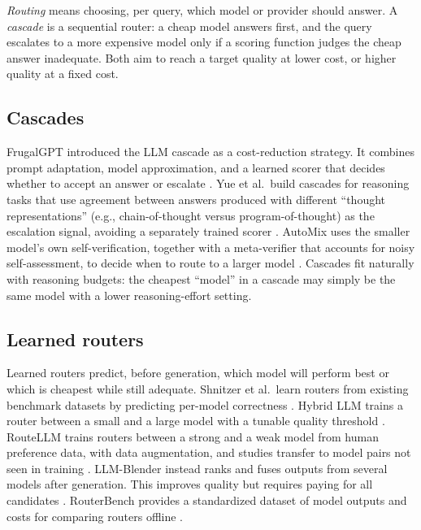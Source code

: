 \emph{Routing} means choosing, per query, which model or provider should answer. A \emph{cascade} is a sequential router: a cheap model answers first, and the query escalates to a more expensive model only if a scoring function judges the cheap answer inadequate. Both aim to reach a target quality at lower cost, or higher quality at a fixed cost.

\subsection{Cascades}\label{cascades}

FrugalGPT introduced the LLM cascade as a cost-reduction strategy. It combines prompt adaptation, model approximation, and a learned scorer that decides whether to accept an answer or escalate \cite{chen2023frugalgpt}. Yue et al.~build cascades for reasoning tasks that use agreement between answers produced with different ``thought representations'' (e.g., chain-of-thought versus program-of-thought) as the escalation signal, avoiding a separately trained scorer \cite{yue2024cascades}. AutoMix uses the smaller model's own self-verification, together with a meta-verifier that accounts for noisy self-assessment, to decide when to route to a larger model \cite{aggarwal2024automix}. Cascades fit naturally with reasoning budgets: the cheapest ``model'' in a cascade may simply be the same model with a lower reasoning-effort setting.

\subsection{Learned routers}\label{learned-routers}

Learned routers predict, before generation, which model will perform best or which is cheapest while still adequate. Shnitzer et al.~learn routers from existing benchmark datasets by predicting per-model correctness \cite{shnitzer2023routing}. Hybrid LLM trains a router between a small and a large model with a tunable quality threshold \cite{ding2024hybrid}. RouteLLM trains routers between a strong and a weak model from human preference data, with data augmentation, and studies transfer to model pairs not seen in training \cite{ong2025routellm}. LLM-Blender instead ranks and fuses outputs from several models after generation. This improves quality but requires paying for all candidates \cite{jiang2023blender}. RouterBench provides a standardized dataset of model outputs and costs for comparing routers offline \cite{hu2024routerbench}.

